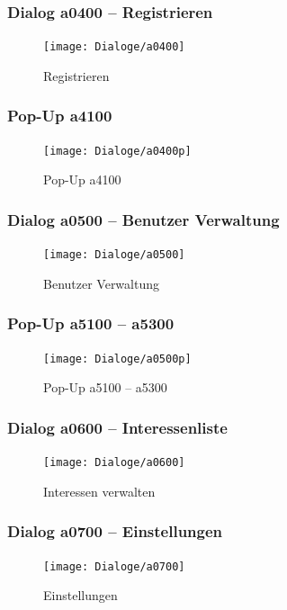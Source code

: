\documentclass[a4paper,12pt,oneside]{scrartcl}
\begin{document}
\newpage
\subsubsection{Dialog a0400 – Registrieren}
\begin{figure}[!htbp]
\centering
\noindent\texttt{[image: Dialoge/a0400]}
\caption{Registrieren}
\end{figure}
\FloatBarrier

\newpage
\subsubsection{Pop-Up a4100}
\begin{figure}[!htbp]
\centering
\noindent\texttt{[image: Dialoge/a0400p]}
\caption{Pop-Up a4100}
\end{figure}
\FloatBarrier

\newpage
\subsubsection{Dialog a0500 – Benutzer Verwaltung}
\begin{figure}[!htbp]
\centering
\noindent\texttt{[image: Dialoge/a0500]}
\caption{Benutzer Verwaltung}
\end{figure}
\FloatBarrier

\newpage
\subsubsection{Pop-Up a5100 – a5300}
\begin{figure}[!htbp]
\centering
\noindent\texttt{[image: Dialoge/a0500p]}
\caption{Pop-Up a5100 – a5300}
\end{figure}
\FloatBarrier

\newpage
\subsubsection{Dialog a0600 – Interessenliste}
\begin{figure}[!htbp]
\centering
\noindent\texttt{[image: Dialoge/a0600]}
\caption{Interessen verwalten}
\end{figure}
\FloatBarrier

\newpage
\subsubsection{Dialog a0700 – Einstellungen}
\begin{figure}[!htbp]
\centering
\noindent\texttt{[image: Dialoge/a0700]}
\caption{Einstellungen}
\end{figure}
\FloatBarrier
\end{document}
